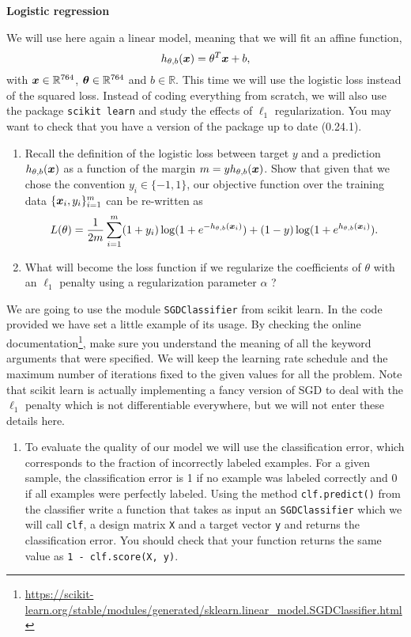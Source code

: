 \documentclass{article}
\begin{document}
{\color{nyupurple} \large \bf Logistic regression}  

We will use here again a linear model, meaning that we will fit an affine function,
\[
h_{\theta, b}(\boldsymbol{x}) = \theta^T\boldsymbol{x} + b,
\]
with $\boldsymbol{x} \in \mathbb{R}^{764}$, $\boldsymbol{\theta} \in \mathbb{R}^{764}$ and $b\in \mathbb{R}$.
This time we will use the logistic loss instead of the squared loss. Instead of coding everything from scratch, we will also use the package \texttt{scikit learn} and study the effects of $\ell_1$ regularization. You may want to check that you have a version of the package up to date (0.24.1).

\begin{enumerate}
\setcounter{enumi}{\value{saveenum}}
  \item Recall the definition of the logistic loss between target $y$ and a prediction $h_{\theta, b}(\boldsymbol{x})$ as a function of the margin $m = y h_{\theta, b}(\boldsymbol{x})$. Show that given that we chose the convention $y_i\in\{-1,1\}$, our objective function over the training data $\{\boldsymbol{x}_i, y_i\}_{i=1}^m$ can be re-written as
  \[
    L(\theta) = \frac 1 {2 m} \sum_{i=1}^m  (1 + y_i) \log ( 1 + e^{- h_{\theta, b}(\boldsymbol{x}_i)}) +  (1 - y) \log(1 + e^{h_{\theta, b}(\boldsymbol{x}_i)}).
    \]

  \item What will become the loss function if we regularize the coefficients of $\theta$ with an $\ell_1$ penalty using a regularization parameter $\alpha$ ?
  

\setcounter{saveenum}{\value{enumi}}
\end{enumerate}

We are going to use the module \texttt{SGDClassifier} from scikit learn. In the code provided we have set a little example of its usage. By checking the online documentation\footnote{\url{https://scikit-learn.org/stable/modules/generated/sklearn.linear_model.SGDClassifier.html}}, make sure you understand the meaning of all the keyword arguments that were specified. We will keep the learning rate schedule and the maximum number of iterations fixed to the given values for all the problem. Note that scikit learn is actually implementing a fancy version of SGD to deal with the $\ell_1$ penalty which is not differentiable everywhere, but we will not enter these details here.

\begin{enumerate}
\setcounter{enumi}{\value{saveenum}}
  \item To evaluate the quality of our model we will use the classification error, which corresponds to the fraction of incorrectly labeled examples. For a given sample, the classification error is 1 if no example was labeled correctly and 0 if all examples were perfectly labeled. 
  Using the method \texttt{clf.predict()} from the classifier write a function that takes as input an \texttt{SGDClassifier} which we will call \texttt{clf}, a design matrix \texttt{X} and a target vector \texttt{y} and returns the classification error. You should check that your function returns the same value as \newline \texttt{1 - clf.score(X, y)}.
\setcounter{saveenum}{\value{enumi}}
\end{enumerate}
\end{document}
